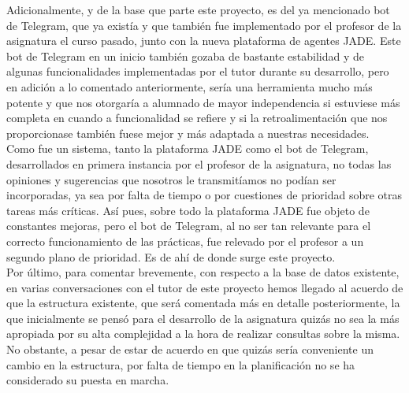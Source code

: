 Adicionalmente, y de la base que parte este proyecto, es del ya mencionado bot de Telegram, que ya existía y que también fue implementado por el profesor de la asignatura el curso pasado, junto con la nueva plataforma de agentes JADE. Este bot de Telegram en un inicio también gozaba de bastante estabilidad y de algunas funcionalidades implementadas por el tutor durante su desarrollo, pero en adición a lo comentado anteriormente, sería una herramienta mucho más potente y que nos otorgaría a alumnado de mayor independencia si estuviese más completa en cuando a funcionalidad se refiere y si la retroalimentación que nos proporcionase también fuese mejor y más adaptada a nuestras necesidades.\\

Como fue un sistema, tanto la plataforma JADE como el bot de Telegram, desarrollados en primera instancia por el profesor de la asignatura, no todas las opiniones y sugerencias que nosotros le transmitíamos no podían ser incorporadas, ya sea por falta de tiempo o por cuestiones de prioridad sobre otras tareas más críticas. Así pues, sobre todo la plataforma JADE fue objeto de constantes mejoras, pero el bot de Telegram, al no ser tan relevante para el correcto funcionamiento de las prácticas, fue relevado por el profesor a un segundo plano de prioridad. Es de ahí de donde surge este proyecto.\\

Por último, para comentar brevemente, con respecto a la base de datos existente, en varias conversaciones con el tutor de este proyecto hemos llegado al acuerdo de que la estructura existente, que será comentada más en detalle posteriormente, la que inicialmente se pensó para el desarrollo de la asignatura quizás no sea la más apropiada por su alta complejidad a la hora de realizar consultas sobre la misma. No obstante, a pesar de estar de acuerdo en que quizás sería conveniente un cambio en la estructura, por falta de tiempo en la planificación no se ha considerado su puesta en marcha.